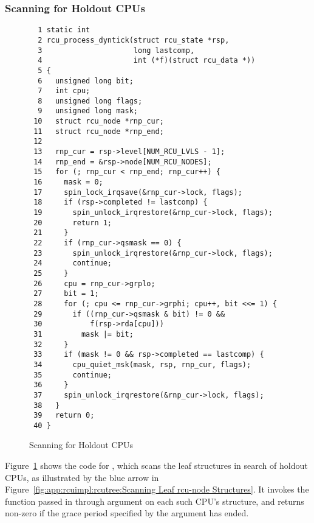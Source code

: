 \subsubsection{Scanning for Holdout CPUs}
\label{app:rcuimpl:rcutreewt:Scanning for Holdout CPUs}

\begin{figure}[tbp]
{ \scriptsize
\begin{verbatim}
  1 static int
  2 rcu_process_dyntick(struct rcu_state *rsp,
  3                     long lastcomp,
  4                     int (*f)(struct rcu_data *))
  5 {
  6   unsigned long bit;
  7   int cpu;
  8   unsigned long flags;
  9   unsigned long mask;
 10   struct rcu_node *rnp_cur;
 11   struct rcu_node *rnp_end;
 12
 13   rnp_cur = rsp->level[NUM_RCU_LVLS - 1];
 14   rnp_end = &rsp->node[NUM_RCU_NODES];
 15   for (; rnp_cur < rnp_end; rnp_cur++) {
 16     mask = 0;
 17     spin_lock_irqsave(&rnp_cur->lock, flags);
 18     if (rsp->completed != lastcomp) {
 19       spin_unlock_irqrestore(&rnp_cur->lock, flags);
 20       return 1;
 21     }
 22     if (rnp_cur->qsmask == 0) {
 23       spin_unlock_irqrestore(&rnp_cur->lock, flags);
 24       continue;
 25     }
 26     cpu = rnp_cur->grplo;
 27     bit = 1;
 28     for (; cpu <= rnp_cur->grphi; cpu++, bit <<= 1) {
 29       if ((rnp_cur->qsmask & bit) != 0 &&
 30           f(rsp->rda[cpu]))
 31         mask |= bit;
 32     }
 33     if (mask != 0 && rsp->completed == lastcomp) {
 34       cpu_quiet_msk(mask, rsp, rnp_cur, flags);
 35       continue;
 36     }
 37     spin_unlock_irqrestore(&rnp_cur->lock, flags);
 38   }
 39   return 0;
 40 }
\end{verbatim}
}
\caption{Scanning for Holdout CPUs}
\label{fig:app:rcuimpl:rcutreewt:Scanning for Holdout CPUs}
\end{figure}

\begin{figure*}[tb]
\centering
{}
\caption{Scanning Leaf {\tt rcu\_node} Structures}
\label{fig:app:rcuimpl:rcutree:Scanning Leaf rcu-node Structures}
\end{figure*}

Figure~\ref{fig:app:rcuimpl:rcutreewt:Scanning for Holdout CPUs}
shows the code for , which scans the
leaf  structures in search of holdout CPUs,
as illustrated by the blue arrow in
Figure~\ref{fig:app:rcuimpl:rcutree:Scanning Leaf rcu-node Structures}.
It invokes the function passed in through argument  on each
such CPU's  structure, and returns non-zero if
the grace period specified by the  argument has ended.

